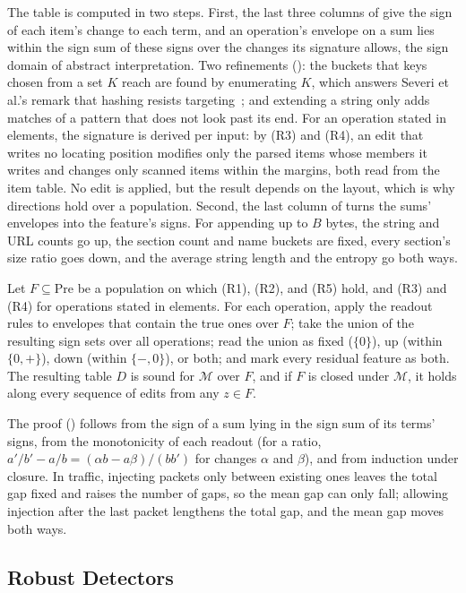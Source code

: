 The table is computed in two steps. First, the last three columns of  give the sign of each item's
change to each term, and an operation's envelope on a sum lies within the sign sum of these signs over the changes its
signature allows, the sign domain of abstract interpretation. Two refinements (): the buckets
that keys chosen from a set $K$ reach are found by enumerating $K$, which answers Severi et al.'s remark that hashing
resists targeting~\cite{severi2021explanation}; and extending a string only adds matches of a pattern that does not
look past its end. For an operation stated in elements, the signature is derived per input: by (R3) and (R4), an edit that
writes no locating position modifies only the parsed items whose members it writes and changes only scanned items
within the margins, both read from the item table. No edit is applied, but the result depends on the layout, which
is why directions hold over a population. Second, the last column of  turns the
sums' envelopes into the feature's signs. For appending up to $B$ bytes, the string and URL counts go up, the section
count and name buckets are fixed, every section's size ratio goes down, and the average string length and the entropy
go both ways.

\label{thm:fw:directions}
{
Let $F \subseteq \mathrm{Pre}$ be a population on which (R1), (R2), and (R5) hold, and (R3) and (R4) for operations
stated in elements. For each operation, apply the readout rules to envelopes that contain the true ones over $F$;
take the union of the resulting sign sets over all operations; read the union as fixed ($\{0\}$), up (within
$\{0, +\}$), down (within $\{-, 0\}$), or both; and mark every residual feature as both. The resulting table $D$ is
sound for $\mathcal{M}$ over $F$, and if $F$ is closed under $\mathcal{M}$, it holds along every sequence of edits from
any $z \in F$.
}

\noindent The proof () follows from the sign of a sum lying in the sign sum of its terms' signs,
from the monotonicity of each readout (for a ratio, $a'/b' - a/b = (\alpha b - a \beta)/(b b')$ for changes $\alpha$
and $\beta$), and from induction under closure. In traffic, injecting packets only between existing ones leaves the
total gap fixed and raises the number of gaps, so the mean gap can only fall; allowing injection after the last packet
lengthens the total gap, and the mean gap moves both ways.

\subsection{Robust Detectors}
\label{sec:fw:robustness}

